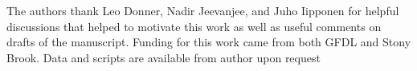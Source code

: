 \documentclass[draft]{agujournal2019}
\begin{document}
%
%
%
%
%
%
\acknowledgments
The authors thank Leo Donner, Nadir Jeevanjee, and Juho Iipponen for helpful discussions  that helped to motivate this work as well as useful comments on drafts of the manuscript.  Funding for this work came from both GFDL and Stony Brook.  Data and scripts are available from author upon request



  
\end{document}
